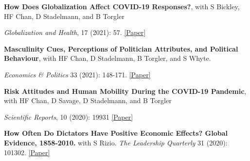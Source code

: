 \documentclass[letterpaper]{article}
\renewenvironment{itemize}{
  \begin{list}{}{
    \setlength{\leftmargin}{1.5em}
  }
}{
  \end{list}
}
\begin{document}
\begin{itemize}
\medskip	
	
	\item \textbf{How Does Globalization Affect COVID-19 Responses?}, with S Bickley, HF Chan, D Stadelmann, and B Torgler 

\vspace{-0.05in}

\item \textit{Globalization and  Health}, 17 (2021): 57. \href{https://globalizationandhealth.biomedcentral.com/articles/10.1186/s12992-021-00677-5}{[Paper]}


	\medskip
	
	\item \textbf{Masculinity Cues, Perceptions of Politician Attributes, and Political Behaviour}, with HF Chan, D Stadelmann, B Torgler, and S Whyte. 
	
	\vspace{-0.05in}

		\item \textit{Economics \& Politics} 33 (2021): 148-171. \href{xhttps://drive.google.com/file/d/1bwZzZJuU1phzjWLgCkL2H-tYz_4uJnxC/view?usp=sharing}{[Paper]}


		\medskip
		
		\item {\bf Risk Attitudes and Human Mobility During the
	COVID-19 Pandemic}, with HF Chan, D Savage, D Stadelmann, and B Torgler
	\vspace{-0.05in}

\item \textit{Scientific Reports}, 10 (2020): 19931 
\href{http://www.crema-research.ch/papers/2020-06.pdf}{[Paper]}

	\medskip
		
	\item \textbf{How Often Do Dictators Have Positive Economic Effects? Global Evidence, 1858-2010.} with S Rizio.
	 \textit{The Leadership Quarterly} 31 (2020): 101302. \href{https://drive.google.com/file/d/1gSZX3oPnJ9YWZwG0Px_6KRd62K9ZNPrj/view}{[Paper]}
	 	

\end{itemize}
\end{document}
